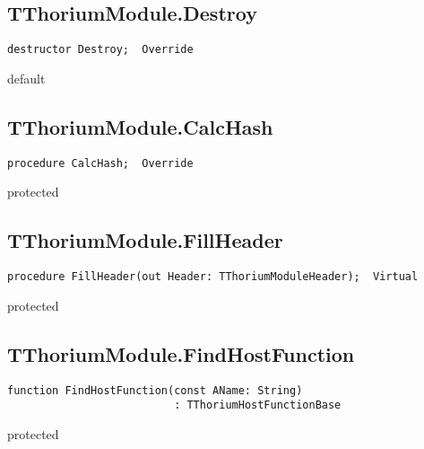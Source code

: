 \subsection{TThoriumModule.Destroy}
\label{thoriumcorepkg:thorium:tthoriummodule:destroy}
\begin{FPCList}
\Declaration 

\begin{verbatim}
destructor Destroy;  Override
\end{verbatim}
\Visibility
default
\end{FPCList}
\subsection{TThoriumModule.CalcHash}
\label{thoriumcorepkg:thorium:tthoriummodule:calchash}
\begin{FPCList}
\Declaration 

\begin{verbatim}
procedure CalcHash;  Override
\end{verbatim}
\Visibility
protected
\end{FPCList}
\subsection{TThoriumModule.FillHeader}
\label{thoriumcorepkg:thorium:tthoriummodule:fillheader}
\begin{FPCList}
\Declaration 

\begin{verbatim}
procedure FillHeader(out Header: TThoriumModuleHeader);  Virtual
\end{verbatim}
\Visibility
protected
\end{FPCList}
\subsection{TThoriumModule.FindHostFunction}
\label{thoriumcorepkg:thorium:tthoriummodule:findhostfunction}
\begin{FPCList}
\Declaration 

\begin{verbatim}
function FindHostFunction(const AName: String)
                          : TThoriumHostFunctionBase
\end{verbatim}
\Visibility
protected
\end{FPCList}
